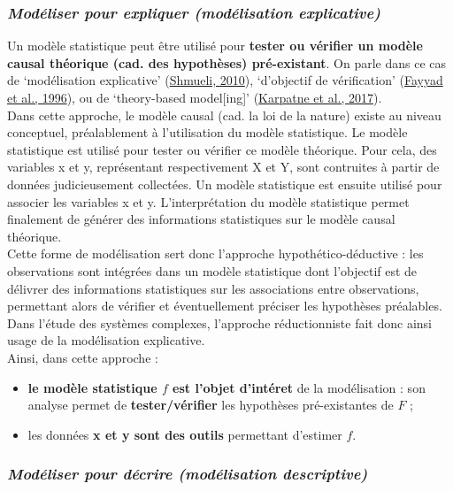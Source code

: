 \documentclass[12pt,twoside]{reedthesis}
\providecommand{\tightlist}{%
  \setlength{\itemsep}{0pt}\setlength{\parskip}{0pt}}
\begin{document}
\hypertarget{moduxe9liser-pour-expliquer-moduxe9lisation-explicative}{%
\subsubsection{\texorpdfstring{\textbf{\emph{Modéliser pour expliquer (modélisation explicative)}}}{Modéliser pour expliquer (modélisation explicative)}}\label{moduxe9liser-pour-expliquer-moduxe9lisation-explicative}}

Un modèle statistique peut être utilisé pour \textbf{tester ou vérifier un modèle causal théorique (cad. des hypothèses) pré-existant}. On parle dans ce cas de `modélisation explicative' (\protect\hyperlink{ref-shmueli_explain_2010}{Shmueli, 2010}), `d'objectif de vérification' (\protect\hyperlink{ref-fayyad_data_nodate}{Fayyad et al., 1996}), ou de `theory-based model{[}ing{]}' (\protect\hyperlink{ref-karpatne_theory-guided_2017}{Karpatne et al., 2017}).\\

Dans cette approche, le modèle causal (cad. la loi de la nature) existe au niveau conceptuel, préalablement à l'utilisation du modèle statistique. Le modèle statistique est utilisé pour tester ou vérifier ce modèle théorique. Pour cela, des variables x et y, représentant respectivement X et Y, sont contruites à partir de données judicieusement collectées. Un modèle statistique est ensuite utilisé pour associer les variables x et y. L'interprétation du modèle statistique permet finalement de générer des informations statistiques sur le modèle causal théorique.\\

Cette forme de modélisation sert donc l'approche hypothético-déductive : les observations sont intégrées dans un modèle statistique dont l'objectif est de délivrer des informations statistiques sur les associations entre observations, permettant alors de vérifier et éventuellement préciser les hypothèses préalables. Dans l'étude des systèmes complexes, l'approche réductionniste fait donc ainsi usage de la modélisation explicative.\\

Ainsi, dans cette approche :
\begin{itemize}
\tightlist
\item
  \textbf{le modèle statistique \(f\) est l'objet d'intéret} de la modélisation : son analyse permet de \textbf{tester/vérifier} les hypothèses pré-existantes de \(F\) ;
\item
  les données \textbf{x et y sont des outils} permettant d'estimer \(f\).
\end{itemize}
\hypertarget{moduxe9liser-pour-duxe9crire-moduxe9lisation-descriptive}{%
\subsubsection{\texorpdfstring{\textbf{\emph{Modéliser pour décrire (modélisation descriptive)}}}{Modéliser pour décrire (modélisation descriptive)}}\label{moduxe9liser-pour-duxe9crire-moduxe9lisation-descriptive}}
\end{document}
